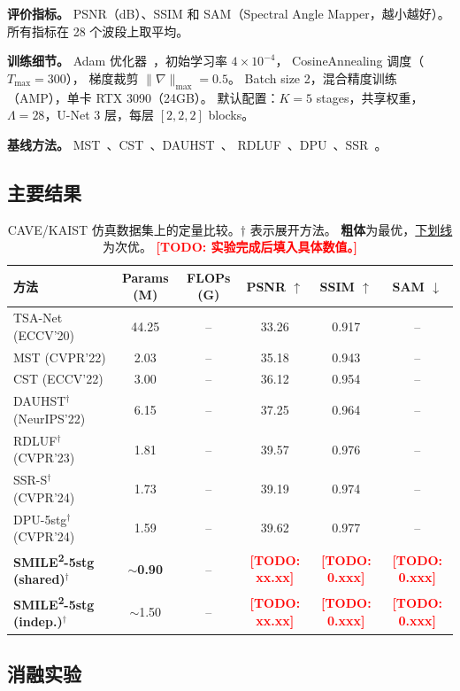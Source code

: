 \documentclass[a4paper,11pt,twocolumn]{ctexart}
\newcommand{\smiletwo}{SMILE\textsuperscript{2}}
\newcommand{\todo}[1]{\textcolor{red}{\textbf{[TODO: #1]}}}
\begin{document}
\textbf{评价指标。}
PSNR（dB）、SSIM 和 SAM（Spectral Angle Mapper，越小越好）。
所有指标在 28 个波段上取平均。

\textbf{训练细节。}
Adam 优化器~\citep{kingma2015adam}，初始学习率 $4 \times 10^{-4}$，
CosineAnnealing 调度（$T_{\max} = 300$），
梯度裁剪 $\|\nabla\|_{\max} = 0.5$。
Batch size 2，混合精度训练（AMP），单卡 RTX 3090（24GB）。
默认配置：$K=5$ stages，共享权重，$\Lambda = 28$，U-Net 3 层，每层 $[2,2,2]$ blocks。

\textbf{基线方法。}
MST~\citep{cai2022mst}、CST~\citep{cai2022cst}、DAUHST~\citep{cai2022dauhst}、
RDLUF~\citep{dong2023rdluf}、DPU~\citep{zhang2024dpu}、SSR~\citep{zhang2024ssr}。

\subsection{主要结果}

\begin{table}[t]
\centering
\caption{CAVE/KAIST 仿真数据集上的定量比较。$\dagger$ 表示展开方法。
\textbf{粗体}为最优，\underline{下划线}为次优。
\todo{实验完成后填入具体数值。}}
\label{tab:main}
\small
\begin{tabular}{l|c|c|ccc}
\toprule
方法 & Params (M) & FLOPs (G) & PSNR $\uparrow$ & SSIM $\uparrow$ & SAM $\downarrow$ \\
\midrule
TSA-Net (ECCV'20) & 44.25 & -- & 33.26 & 0.917 & -- \\
MST (CVPR'22) & 2.03 & -- & 35.18 & 0.943 & -- \\
CST (ECCV'22) & 3.00 & -- & 36.12 & 0.954 & -- \\
\midrule
DAUHST$^\dagger$ (NeurIPS'22) & 6.15 & -- & 37.25 & 0.964 & -- \\
RDLUF$^\dagger$ (CVPR'23) & 1.81 & -- & 39.57 & 0.976 & -- \\
SSR-S$^\dagger$ (CVPR'24) & 1.73 & -- & 39.19 & 0.974 & -- \\
DPU-5stg$^\dagger$ (CVPR'24) & 1.59 & -- & 39.62 & 0.977 & -- \\
\midrule
\textbf{\smiletwo{}-5stg (shared)$^\dagger$} & \textbf{$\sim$0.90} & -- & \todo{xx.xx} & \todo{0.xxx} & \todo{0.xxx} \\
\textbf{\smiletwo{}-5stg (indep.)$^\dagger$} & $\sim$1.50 & -- & \todo{xx.xx} & \todo{0.xxx} & \todo{0.xxx} \\
\bottomrule
\end{tabular}
\end{table}


\subsection{消融实验}
\end{document}
